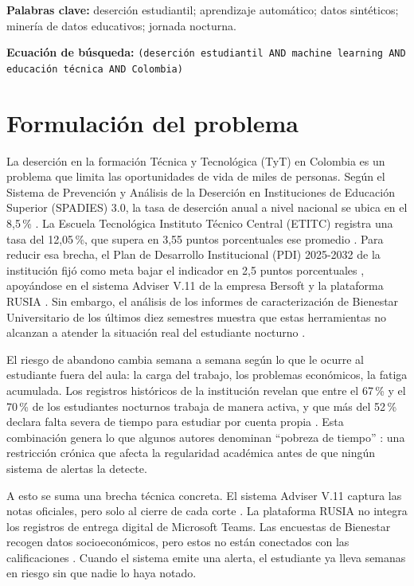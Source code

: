 \documentclass[12pt,letterpaper]{article}
\newcommand{\ETITC}{Escuela Tecnológica Instituto Técnico Central (ETITC)\xspace}
\newcommand{\PDI}{Plan de Desarrollo Institucional (PDI)\xspace}
\newcommand{\TyT}{Técnica y Tecnológica (TyT)\xspace}
\newcommand{\SPADIES}{Sistema de Prevención y Análisis de la Deserción en Instituciones de Educación Superior (SPADIES)\xspace}
\begin{document}
\vspace{0.3cm}
\noindent\textbf{Palabras clave:} deserción estudiantil; aprendizaje automático; datos sintéticos; minería de datos educativos; jornada nocturna.

\vspace{0.3cm}
\noindent\textbf{Ecuación de búsqueda:} \texttt{(deserción estudiantil AND machine learning AND educación técnica AND Colombia)}

\newpage

\section{Formulación del problema}

La deserción en la formación \TyT en Colombia es un problema que limita las oportunidades de vida de miles de personas. Según el \SPADIES 3.0, la tasa de deserción anual a nivel nacional se ubica en el 8,5\,\% \parencite{men2025}. La \ETITC registra una tasa del 12,05\,\%, que supera en 3,55 puntos porcentuales ese promedio \parencite{etitc2025b}. Para reducir esa brecha, el \PDI 2025-2032 de la institución fijó como meta bajar el indicador en 2,5 puntos porcentuales \parencite{etitc2025b}, apoyándose en el sistema Adviser V.11 de la empresa Bersoft y la plataforma RUSIA \parencite{bersoft2024}. Sin embargo, el análisis de los informes de caracterización de Bienestar Universitario de los últimos diez semestres muestra que estas herramientas no alcanzan a atender la situación real del estudiante nocturno \parencite{etitc_bienestar}.

El riesgo de abandono cambia semana a semana según lo que le ocurre al estudiante fuera del aula: la carga del trabajo, los problemas económicos, la fatiga acumulada. Los registros históricos de la institución revelan que entre el 67\,\% y el 70\,\% de los estudiantes nocturnos trabaja de manera activa, y que más del 52\,\% declara falta severa de tiempo para estudiar por cuenta propia \parencite{etitc_bienestar}. Esta combinación genera lo que algunos autores denominan ``pobreza de tiempo'' \parencite{arias2018}: una restricción crónica que afecta la regularidad académica antes de que ningún sistema de alertas la detecte.

A esto se suma una brecha técnica concreta. El sistema Adviser V.11 captura las notas oficiales, pero solo al cierre de cada corte \parencite{bersoft2024}. La plataforma RUSIA no integra los registros de entrega digital de Microsoft Teams. Las encuestas de Bienestar recogen datos socioeconómicos, pero estos no están conectados con las calificaciones \parencite{etitc_bienestar}. Cuando el sistema emite una alerta, el estudiante ya lleva semanas en riesgo sin que nadie lo haya notado.
\end{document}
